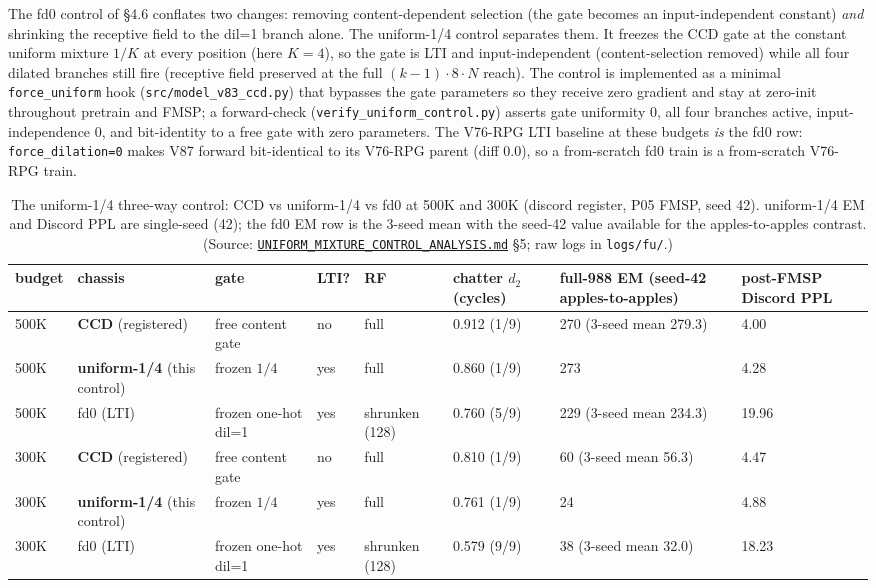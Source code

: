 \documentclass[11pt]{article}
\begin{document}
The fd0 control of \S4.6 conflates two changes: removing content-dependent selection (the gate becomes an input-independent constant) \emph{and} shrinking the receptive field to the dil=1 branch alone. The uniform-1/4 control separates them. It freezes the CCD gate at the constant uniform mixture $1/K$ at every position (here $K=4$), so the gate is LTI and input-independent (content-selection removed) while all four dilated branches still fire (receptive field preserved at the full $(k-1)\cdot 8\cdot N$ reach). The control is implemented as a minimal \texttt{force\_uniform} hook (\texttt{src/model\_v83\_ccd.py}) that bypasses the gate parameters so they receive zero gradient and stay at zero-init throughout pretrain and FMSP; a forward-check (\texttt{verify\_uniform\_control.py}) asserts gate uniformity 0, all four branches active, input-independence 0, and bit-identity to a free gate with zero parameters. The V76-RPG LTI baseline at these budgets \emph{is} the fd0 row: \texttt{force\_dilation=0} makes V87 forward bit-identical to its V76-RPG parent (diff 0.0), so a from-scratch fd0 train is a from-scratch V76-RPG train.

\begin{table}[!t]
\footnotesize
\caption{The uniform-1/4 three-way control: CCD vs uniform-1/4 vs fd0 at 500K and 300K (discord register, P05 FMSP, seed 42). uniform-1/4 EM and Discord PPL are single-seed (42); the fd0 EM row is the 3-seed mean with the seed-42 value available for the apples-to-apples contrast. (Source: \href{https://github.com/llaa33219/MicroMixer-4/blob/4bb630413dfa58ef3141291e121ab8c006d03235/UNIFORM_MIXTURE_CONTROL_ANALYSIS.md}{\texttt{UNIFORM\_MIXTURE\_CONTROL\_ANALYSIS.md}} \S5; raw logs in \texttt{logs/fu/}.)}
\label{tab:uniform-control}
\centering
\setlength{\tabcolsep}{4pt}\scriptsize
\begin{tabular}{lp{2.4cm}p{2.2cm}llp{1.9cm}p{3.2cm}p{1.8cm}}
\toprule
budget & chassis & gate & LTI? & RF & chatter $d_2$ (cycles) & full-988 EM (seed-42 apples-to-apples) & post-FMSP Discord PPL \\
\midrule
500K & \textbf{CCD} (registered) & free content gate & no & full & 0.912 (1/9) & 270 (3-seed mean 279.3) & 4.00 \\
500K & \textbf{uniform-1/4} (this control) & frozen $1/4$ & yes & full & 0.860 (1/9) & 273 & 4.28 \\
500K & fd0 (LTI) & frozen one-hot dil=1 & yes & shrunken (128) & 0.760 (5/9) & 229 (3-seed mean 234.3) & 19.96 \\
300K & \textbf{CCD} (registered) & free content gate & no & full & 0.810 (1/9) & 60 (3-seed mean 56.3) & 4.47 \\
300K & \textbf{uniform-1/4} (this control) & frozen $1/4$ & yes & full & 0.761 (1/9) & 24 & 4.88 \\
300K & fd0 (LTI) & frozen one-hot dil=1 & yes & shrunken (128) & 0.579 (9/9) & 38 (3-seed mean 32.0) & 18.23 \\
\bottomrule
\end{tabular}
\end{table}
\end{document}
